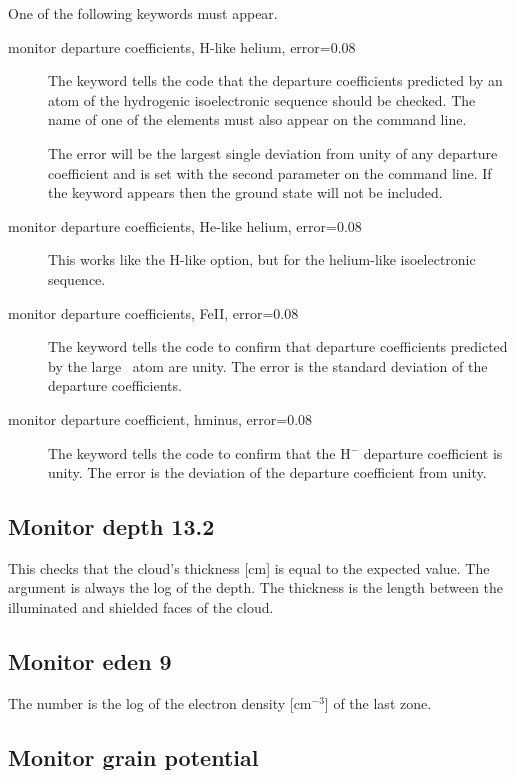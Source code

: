 One of the following keywords must appear.
\begin{description}
\item[monitor departure coefficients, H-like helium, error=0.08]  The keyword
 tells the code that the departure coefficients predicted by an atom
of the hydrogenic isoelectronic sequence should be checked.  The name of
one of the elements must also appear on the command line.

The error will be the largest single deviation from unity of
any departure coefficient and is set with the second
parameter on the command line.
If
the keyword  appears then the ground state will not be included.

\item[monitor departure coefficients, He-like helium, error=0.08]
This works
like the H-like option, but for the helium-like isoelectronic sequence.

\item[monitor departure coefficients, FeII, error=0.08]
The keyword  tells
the code to confirm that departure coefficients predicted by the large \feii\ atom are unity.
The error is the standard deviation of the departure coefficients.

\item[monitor departure coefficient, hminus, error=0.08]
The keyword 
tells the code to confirm that the H$^-$ departure coefficient is unity.
The error is the deviation of the departure coefficient from unity.
\end{description}

\subsection{Monitor depth 13.2}

This checks that the cloud's thickness [cm] is equal to the expected
value.
The argument is always the log of the depth.
The thickness is the
length between the illuminated and shielded faces of the cloud.

\subsection{Monitor eden 9}

The number is the log of the electron density [cm$^{-3}$] of the last zone.

\subsection{Monitor grain potential}


